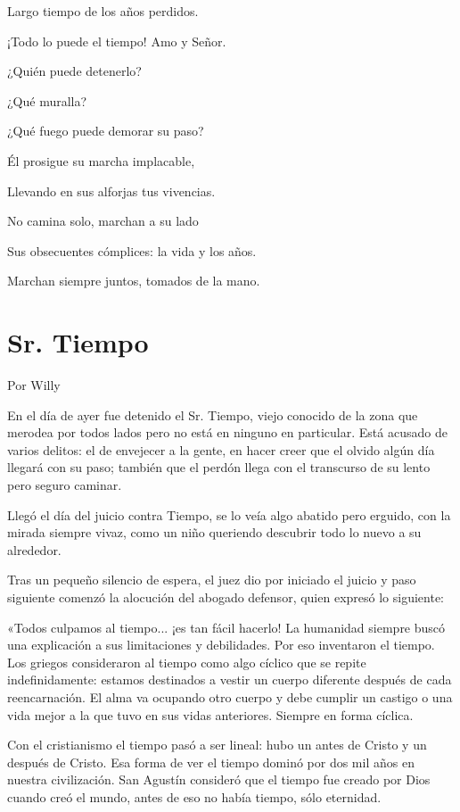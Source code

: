 \documentclass[11pt,twoside,openright,a5paper]{book}
\begin{document}
Largo tiempo de los años perdidos.

¡Todo lo puede el tiempo! Amo y Señor.

¿Quién puede detenerlo?

¿Qué muralla?

¿Qué fuego puede demorar su paso?

Él prosigue su marcha implacable,

Llevando en sus alforjas tus vivencias.

No camina solo, marchan a su lado

Sus obsecuentes cómplices: la vida y los años.

Marchan siempre juntos, tomados de la mano.

\section*{Sr. Tiempo}
                                                                                           \begin{flushright}Por Willy\end{flushright}

En el día de ayer fue detenido el Sr. Tiempo, viejo conocido de la zona que merodea por todos lados pero no está en ninguno en particular. Está acusado de varios delitos: el de envejecer a la gente, en hacer creer que el olvido algún día llegará con su paso; también que el perdón llega con el transcurso de su lento pero seguro caminar.

Llegó el día del juicio contra Tiempo, se lo veía algo abatido pero erguido, con la mirada siempre vivaz, como un niño queriendo descubrir todo lo nuevo a su alrededor. 

Tras un pequeño silencio de espera, el juez dio por iniciado el juicio y paso siguiente comenzó la alocución del abogado defensor, quien expresó lo siguiente: 

«Todos culpamos al tiempo... ¡es tan fácil hacerlo! La humanidad siempre buscó una explicación a sus limitaciones y debilidades. Por eso inventaron el tiempo. Los griegos consideraron al tiempo como algo cíclico que se repite indefinidamente: estamos destinados a vestir un cuerpo diferente después de cada reencarnación. El alma va ocupando otro cuerpo y debe cumplir un castigo o una vida mejor a la que tuvo en sus vidas anteriores. Siempre en forma cíclica.

Con el cristianismo el tiempo pasó a ser lineal: hubo un antes de Cristo y un después de Cristo. Esa forma de ver el tiempo dominó por dos mil años en nuestra civilización. San Agustín consideró que el tiempo fue creado por Dios cuando creó el mundo, antes de eso no había tiempo, sólo eternidad.
\end{document}
